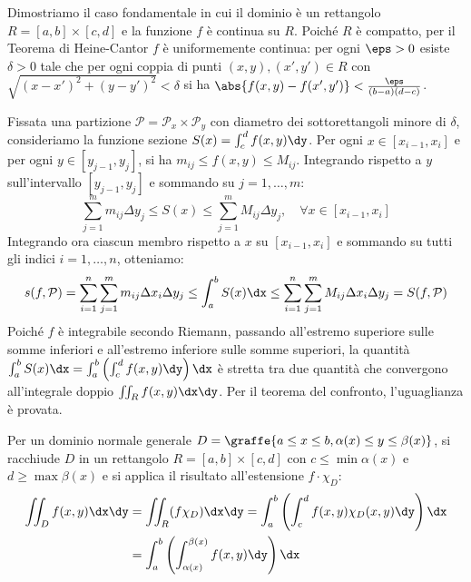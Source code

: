 \begin{dimostrazione}
Dimostriamo il caso fondamentale in cui il dominio è un rettangolo $R = [a,b] \times [c,d]$ e la funzione $f$ è continua su $R$.
Poiché $R$ è compatto, per il Teorema di Heine-Cantor $f$ è uniformemente continua: per ogni $\eps > 0$ esiste $\delta > 0$ tale che per ogni coppia di punti $(x,y), (x',y') \in R$ con $\sqrt{(x-x')^2 + (y-y')^2} < \delta$ si ha $\abs{f(x,y) - f(x',y')} < \frac{\eps}{(b-a)(d-c)}$.

Fissata una partizione $\mathcal{P} = \mathcal{P}_x \times \mathcal{P}_y$ con diametro dei sottorettangoli minore di $\delta$, consideriamo la funzione sezione $S(x) = \int_c^d f(x,y)\dy$. Per ogni $x \in [x_{i-1}, x_i]$ e per ogni $y \in [y_{j-1}, y_j]$, si ha $m_{ij} \le f(x,y) \le M_{ij}$. Integrando rispetto a $y$ sull'intervallo $[y_{j-1}, y_j]$ e sommando su $j=1,\dots,m$:
\[
\sum_{j=1}^m m_{ij} \Delta y_j \le S(x) \le \sum_{j=1}^m M_{ij} \Delta y_j, \quad \forall x \in [x_{i-1}, x_i]
\]
Integrando ora ciascun membro rispetto a $x$ su $[x_{i-1}, x_i]$ e sommando su tutti gli indici $i=1,\dots,n$, otteniamo:
\[
s(f, \mathcal{P}) = \sum_{i=1}^n \sum_{j=1}^m m_{ij} \Delta x_i \Delta y_j \le \int_a^b S(x)\dx \le \sum_{i=1}^n \sum_{j=1}^m M_{ij} \Delta x_i \Delta y_j = S(f, \mathcal{P})
\]
Poiché $f$ è integrabile secondo Riemann, passando all'estremo superiore sulle somme inferiori e all'estremo inferiore sulle somme superiori, la quantità $\int_a^b S(x)\dx = \int_a^b \left(\int_c^d f(x,y)\dy\right)\dx$ è stretta tra due quantità che convergono all'integrale doppio $\iint_R f(x,y)\dx\dy$. Per il teorema del confronto, l'uguaglianza è provata.

Per un dominio normale generale $D = \graffe{a \le x \le b, \alpha(x) \le y \le \beta(x)}$, si racchiude $D$ in un rettangolo $R = [a,b] \times [c,d]$ con $c \le \min \alpha(x)$ e $d \ge \max \beta(x)$ e si applica il risultato all'estensione $f \cdot \chi_D$:
\begin{align*}
\iint_D f(x,y) \dx\dy &= \iint_R (f \chi_D) \dx\dy = \int_a^b \left( \int_c^d f(x,y)\chi_D(x,y) \dy \right) \dx \\
&= \int_a^b \left( \int_{\alpha(x)}^{\beta(x)} f(x,y) \dy \right) \dx
\end{align*}
\end{dimostrazione}

